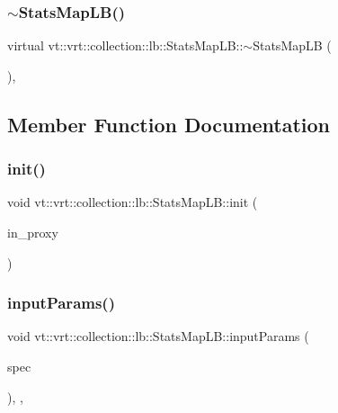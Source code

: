 \subsubsection{\texorpdfstring{$\sim$\+Stats\+Map\+L\+B()}{~StatsMapLB()}}
{\footnotesize\ttfamily virtual vt\+::vrt\+::collection\+::lb\+::\+Stats\+Map\+L\+B\+::$\sim$\+Stats\+Map\+LB (\begin{DoxyParamCaption}{ }\end{DoxyParamCaption})\hspace{0.3cm}{\ttfamily [virtual]}, {\ttfamily [default]}}



\subsection{Member Function Documentation}
\mbox{\label{structvt_1_1vrt_1_1collection_1_1lb_1_1_stats_map_l_b_a5af7ebfa026d3b236fee88bc2b5d139e}} 
\subsubsection{\texorpdfstring{init()}{init()}}
{\footnotesize\ttfamily void vt\+::vrt\+::collection\+::lb\+::\+Stats\+Map\+L\+B\+::init (\begin{DoxyParamCaption}\item[{\hyperlink{structvt_1_1objgroup_1_1proxy_1_1_proxy}{objgroup\+::proxy\+::\+Proxy}$<$ \hyperlink{structvt_1_1vrt_1_1collection_1_1lb_1_1_stats_map_l_b}{Stats\+Map\+LB} $>$}]{in\+\_\+proxy }\end{DoxyParamCaption})}

\mbox{\label{structvt_1_1vrt_1_1collection_1_1lb_1_1_stats_map_l_b_a495d91782f11c1bb5d1774a05b2a73f6}} 
\subsubsection{\texorpdfstring{input\+Params()}{inputParams()}}
{\footnotesize\ttfamily void vt\+::vrt\+::collection\+::lb\+::\+Stats\+Map\+L\+B\+::input\+Params (\begin{DoxyParamCaption}\item[{\hyperlink{structvt_1_1vrt_1_1collection_1_1balance_1_1_spec_entry}{balance\+::\+Spec\+Entry} $\ast$}]{spec }\end{DoxyParamCaption})\hspace{0.3cm}{\ttfamily [inline]}, {\ttfamily [override]}, {\ttfamily [virtual]}}



